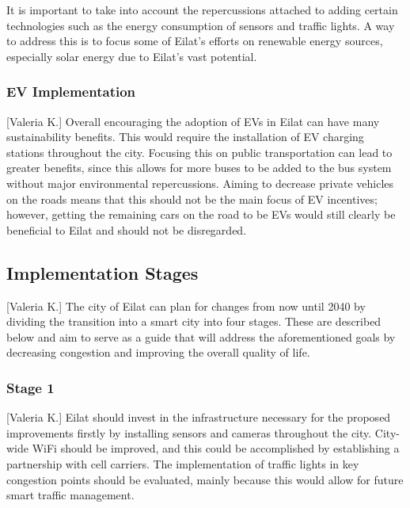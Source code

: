 \documentclass[12pt]{article}                               %
\begin{document}
It is important to take into account the repercussions attached to adding certain technologies such as the energy consumption of sensors and traffic lights. A way to address this is to focus some of Eilat's efforts on renewable energy sources, especially solar energy due to Eilat's vast potential.

\subsubsection{EV Implementation}[Valeria K.]
Overall encouraging the adoption of EVs in Eilat can have many sustainability benefits. This would require the installation of EV charging stations throughout the city. Focusing this on public transportation can lead to greater benefits, since this allows for more buses to be added to the bus system without major environmental repercussions. Aiming to decrease private vehicles on the roads means that this should not be the main focus of EV incentives; however, getting the remaining cars on the road to be EVs would still clearly be beneficial to Eilat and should not be disregarded. 

\subsection{Implementation Stages}[Valeria K.] \label{sec:implementation_stages}
The city of Eilat can plan for changes from now until 2040 by dividing the transition into a smart city into four stages. These are described below and aim to serve as a guide that will address the aforementioned goals by decreasing congestion and improving the overall quality of life. 


\subsubsection{Stage 1}[Valeria K.]
Eilat should invest in the infrastructure necessary for the proposed improvements firstly by installing sensors and cameras throughout the city. City-wide WiFi should be improved, and this could be accomplished by establishing a partnership with cell carriers. The implementation of traffic lights in key congestion points should be evaluated, mainly because this would allow for future smart traffic management. 
\end{document}
